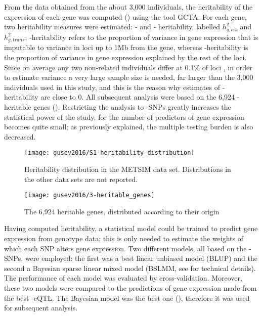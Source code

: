 \documentclass[../main.tex]{subfiles}
\begin{document}
From the data obtained from the about 3,000 individuals, the 
heritability of the expression of each gene was computed 
() using the tool GCTA\autocite{Yang2011}. For each 
gene, two heritability measures were estimated: \cis- and \trans- 
heritability, labelled $h_{g,cis}^2$ and $h_{g,trans}^2$; 
\cis-heritability refers to the proportion of variance in gene 
expression that is imputable to variance in loci up to 1Mb from the 
gene, whereas \trans-heritability is the proportion of variance in gene 
expression explained by the rest of the loci. Since on average any two 
non-related individuals differ at 0.1\% of loci \autocite{Auton2015}, in 
order to estimate \trans variance a very large sample size is needed, 
far larger than the 3,000 individuals used in this study, and this is 
the reason why estimates of \trans-heritability are close to $0$. All 
subsequent analysis were based on the 6,924 \cis-heritable genes 
(). Restricting the analysis to \cis-SNPs greatly 
increases the statistical power of the study, for the number of 
predictors of gene expression becomes quite small; as previously 
explained, the multiple testing burden is also decreased.

\begin{figure}
	\centering
	\texttt{[image: gusev2016/S1-heritability\_distribution]}
	\caption{Heritability distribution in the METSIM data set. 
		Distributions in the other data sets are not reported.}
\end{figure}

\begin{figure}
	\centering
	\texttt{[image: gusev2016/3-heritable\_genes]}
	\caption{The 6,924 heritable genes, distributed according to their 
origin}
\end{figure}

Having computed heritability, a statistical model could be trained to 
predict gene expression from genotype data; this is only needed to 
estimate the weights of which each SNP alters gene expression. Two 
different models, all based on the \cis-SNPs, were employed: the first 
was a best linear unbiased model (BLUP) and the second a Bayesian sparse 
linear mixed model (BSLMM, see  for technical 
details). The performance of each model was evaluated by 
cross-validation. Moreover, these two models were compared to the 
predictions of gene expression made from the best \cis-eQTL. The 
Bayesian model was the best one (), therefore it was 
used for subsequent analysis.
\end{document}
